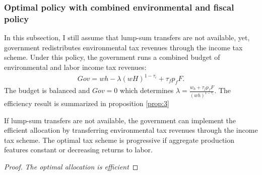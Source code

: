 \subsubsection{Optimal policy with combined environmental and fiscal policy}

In this subsection, I still assume that lump-sum transfers are not available, yet, government redistributes environmental tax revenues through the income tax scheme.
Under this policy, the government runs a combined budget of environmental and labor income tax revenues:  
\begin{align}
Gov= wh-\lambda (wH)^{1-\tau_\iota}+\tau_f p_fF.
\end{align}
The budget is balanced and $Gov = 0$ which determines $\lambda=\frac{w_h + \tau_f p_f F}{(wh)^{1-\tau_{\iota}}}$. The efficiency result is summarized in proposition \ref{prop:3}
\begin{prop}\label{prop:3}
	If lump-sum transfers are not available, the government can implement the efficient allocation by  transferring environmental tax revenues through the income tax scheme. The optimal tax scheme is progressive if aggregate production features constant or decreasing returns to labor.
\end{prop}

\begin{proof}\textit{The optimal allocation is efficient}
\end{proof}


